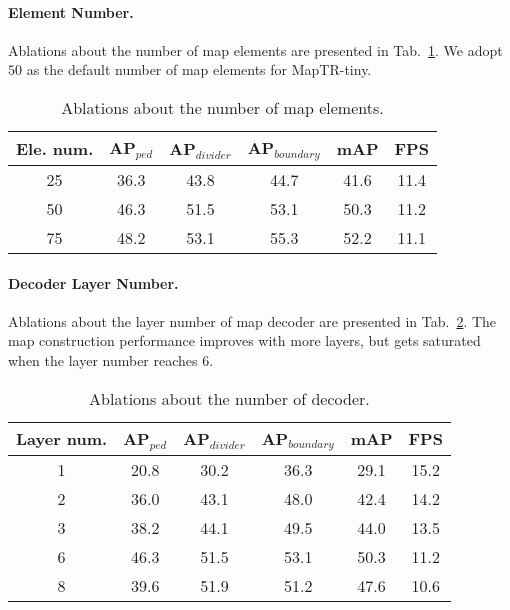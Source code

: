 \documentclass{article} \usepackage{iclr2023_conference,times}
\begin{document}
\paragraph{Element Number.}
Ablations about the number of map elements are presented in Tab.~\ref{tab:element-number}. We adopt $50$ as the default number of map elements for MapTR-tiny.

\begin{table}[ht]
\begin{center}
\begin{tabular}{c|ccc|cc}
\hline
\rowcolor{Gray}
Ele. num. & AP$_{\textit{ped}}$ & AP$_{\textit{divider}}$ & AP$_{\textit{boundary}}$ &mAP & FPS  \\
\toprule
25        &36.3&43.8&44.7& 41.6  & 11.4 \\
50  &\cellcolor{blue!10}46.3&\cellcolor{blue!10}51.5&\cellcolor{blue!10}53.1&\cellcolor{blue!10}50.3&\cellcolor{blue!10}11.2\\
75 &48.2&53.1&55.3  &52.2 & 11.1\\
\bottomrule
\end{tabular}
\end{center}
\vspace*{-0.45cm}
\caption{Ablations about the number of map elements.}
\label{tab:element-number}
\vspace*{-0.35cm}
\end{table}

\paragraph{Decoder Layer Number.}
Ablations about the layer number of map decoder are presented in Tab.~\ref{tab:layer-number}. The map construction performance improves with more layers, but gets saturated when the layer number reaches $6$. 


\begin{table}[ht]
\begin{center}
\begin{tabular}{c|ccc|cc}
\hline
\rowcolor{Gray}
Layer num. & AP$_{\textit{ped}}$ & AP$_{\textit{divider}}$ & AP$_{\textit{boundary}}$ &mAP & FPS  \\
\toprule
1  &20.8 & 30.2 & 36.3& 29.1 & 15.2 \\
2  &36.0 & 43.1 & 48.0 & 42.4 & 14.2\\
3 &38.2 &44.1 & 49.5&  44.0 & 13.5\\
6 &\cellcolor{blue!10}46.3&\cellcolor{blue!10}51.5&\cellcolor{blue!10}53.1&\cellcolor{blue!10}50.3&\cellcolor{blue!10}11.2\\
8 &39.6 & 51.9 & 51.2& 47.6 & 10.6\\
\bottomrule
\end{tabular}
\end{center}
\vspace*{-0.45cm}
\caption{Ablations about the number of decoder. }
\label{tab:layer-number}
\vspace*{-0.35cm}
\end{table}
\end{document}

